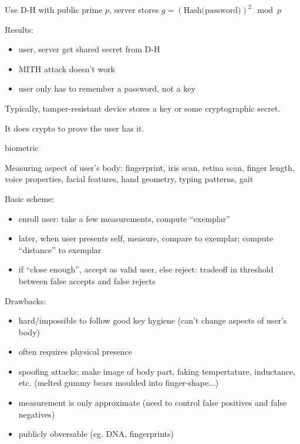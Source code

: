 \begin{itemize}
        Use D-H with public prime $p$, server stores
        $g = (\text{Hash(password)})^2 \mod p$

        Results:
        \begin{itemize}
            \item user, server get shared secret from D-H
            \item MITH attack doesn't work
            \item user only has to remember a password, not a key
        \end{itemize}
\end{itemize}
Typically, tamper-resistant device stores a key or some cryptographic secret.

It does crypto to prove the user has it.
\begin{definition}{biometric}

Measuring aspect of user's body: fingerprint, iris scan, retina scan, finger
length, voice properties, facial features, hand geometry, typing patterns, gait
\end{definition}
Basic scheme:
\begin{itemize}
    \item enroll user: take a few measurements, compute ``exemplar''
    \item later, when user presents self, measure, compare to exemplar; compute
            ``distance'' to exemplar
    \item if ``close enough'', accept as valid user, else reject: tradeoff in
    threshold between false accepts and false rejects
\end{itemize}
Drawbacks:
\begin{itemize}
    \item hard/impossible to follow good key hygiene (can't change aspects of user's body)
    \item often requires physical presence
    \item spoofing attacks; make image of body part, faking tempertature,
            inductance, etc. (melted gummy bears moulded into finger-shape...)
    \item measurement is only approximate (need to control false positives and false negatives)
    \item publicly obversable (eg. DNA, fingerprints)
\end{itemize}
